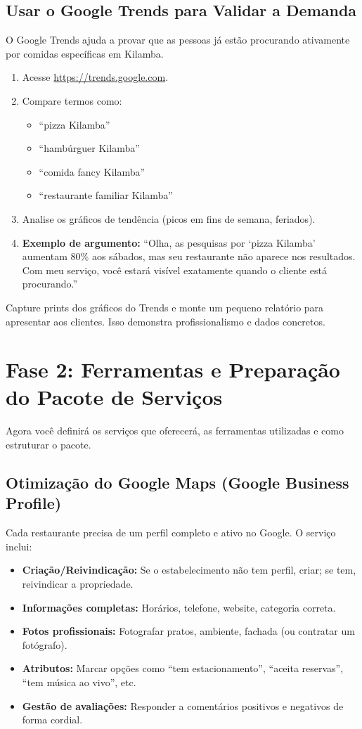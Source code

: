 \documentclass[a4paper,12pt]{article}
\begin{document}
\subsection{Usar o Google Trends para Validar a Demanda}
O Google Trends ajuda a provar que as pessoas já estão procurando ativamente por comidas específicas em Kilamba.
\begin{enumerate}
    \item Acesse \url{https://trends.google.com}.
    \item Compare termos como:
    \begin{itemize}
        \item “pizza Kilamba”
        \item “hambúrguer Kilamba”
        \item “comida fancy Kilamba”
        \item “restaurante familiar Kilamba”
    \end{itemize}
    \item Analise os gráficos de tendência (picos em fins de semana, feriados).
    \item \textbf{Exemplo de argumento:} “Olha, as pesquisas por ‘pizza Kilamba’ aumentam 80\% aos sábados, mas seu restaurante não aparece nos resultados. Com meu serviço, você estará visível exatamente quando o cliente está procurando.”
\end{enumerate}

\begin{dica}
    Capture prints dos gráficos do Trends e monte um pequeno relatório para apresentar aos clientes. Isso demonstra profissionalismo e dados concretos.
\end{dica}

\section{Fase 2: Ferramentas e Preparação do Pacote de Serviços}
Agora você definirá os serviços que oferecerá, as ferramentas utilizadas e como estruturar o pacote.

\subsection{Otimização do Google Maps (Google Business Profile)}
Cada restaurante precisa de um perfil completo e ativo no Google. O serviço inclui:
\begin{itemize}
    \item \textbf{Criação/Reivindicação:} Se o estabelecimento não tem perfil, criar; se tem, reivindicar a propriedade.
    \item \textbf{Informações completas:} Horários, telefone, website, categoria correta.
    \item \textbf{Fotos profissionais:} Fotografar pratos, ambiente, fachada (ou contratar um fotógrafo).
    \item \textbf{Atributos:} Marcar opções como “tem estacionamento”, “aceita reservas”, “tem música ao vivo”, etc.
    \item \textbf{Gestão de avaliações:} Responder a comentários positivos e negativos de forma cordial.
\end{itemize}
\end{document}
